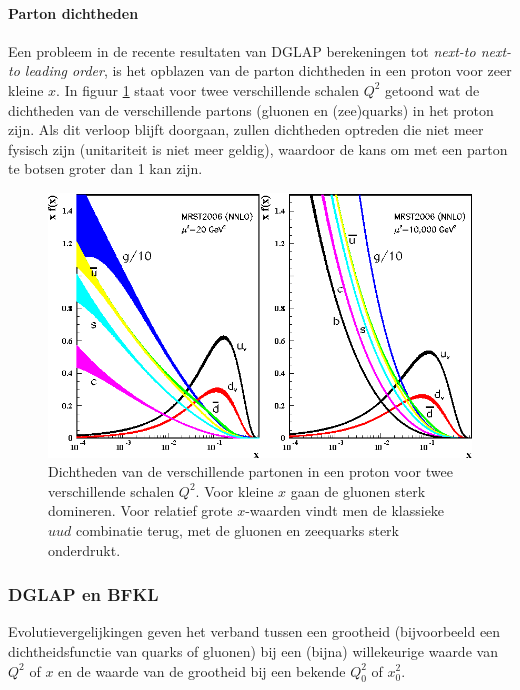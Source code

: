 \documentclass[a4paper,11pt]{article}
\numberwithin{equation}{section} %
\begin{document}
      \paragraph{Parton dichtheden}
Een probleem in de recente resultaten van DGLAP berekeningen tot \textit{next-to next-to leading order}, is het opblazen van de parton dichtheden in een proton voor zeer kleine $x$.
In figuur \ref{fig:PD} staat voor twee verschillende schalen $Q^2$ getoond wat de dichtheden van de verschillende partons (gluonen en (zee)quarks) in het proton zijn.
Als dit verloop blijft doorgaan, zullen dichtheden optreden die niet meer fysisch zijn (unitariteit is niet meer geldig), waardoor de kans om met een parton te botsen groter dan 1 kan zijn.
\begin{figure} [H]
  \begin{center}
    \includegraphics[scale=1]{Afbeeldingen/PD.eps}
    \caption{Dichtheden van de verschillende partonen in een proton voor twee verschillende schalen $Q^2$. Voor kleine $x$ gaan de gluonen sterk domineren. Voor relatief grote $x$-waarden vindt men de klassieke $uud$ combinatie terug, met de gluonen en zeequarks sterk onderdrukt. \cite{Martin}}
   \label{fig:PD}
  \end{center}
\end{figure}

    \subsubsection{DGLAP en BFKL}
Evolutievergelijkingen geven het verband tussen een grootheid (bijvoorbeeld een dichtheidsfunctie van quarks of gluonen) bij een (bijna) willekeurige waarde van $Q^2$ of $x$ en de waarde van de grootheid bij een bekende $Q_0^2$ of $x_0^2$.
\end{document}
